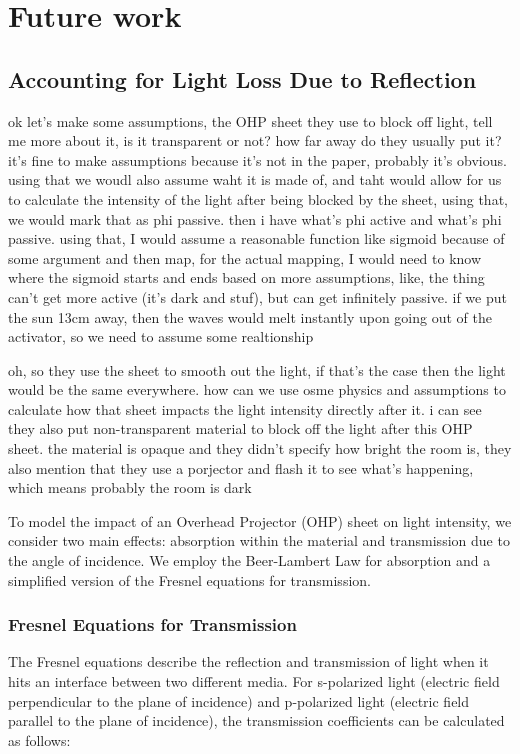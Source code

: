 \chapter{Future work}
\section{Accounting for Light Loss Due to Reflection} \label{sec:reflection-refraction}
ok let's make some assumptions, the OHP sheet they use to block off light, tell me more about it, is it transparent or not? how far away do they usually put it? it's fine to make assumptions because it's not in the paper, probably it's obvious. using that we woudl also assume waht it is made of, and taht would allow for us to calculate the intensity of the light after being blocked by the sheet, using that, we would mark that as phi passive. then i have what's phi active and what's phi passive. using that, I would assume a reasonable function like sigmoid because of some argument and then map, for the actual mapping, I would need to know where the sigmoid starts and ends based on more assumptions, like, the thing can't get more active (it's dark and stuf), but can get infinitely passive. if we put the sun 13cm away, then the waves would melt instantly upon going out of the activator, so we need to assume some realtionship


oh, so they use the sheet to smooth out the light, if that's the case then the light would be the same everywhere. how can we use osme physics and assumptions to calculate how that sheet impacts the light intensity directly after it.
i can see they also put non-transparent material to block off the light after this OHP sheet. the material is opaque and they didn't specify how bright the room is, they also mention that they use a porjector and flash it to see what's happening, which means probably the room is dark


To model the impact of an Overhead Projector (OHP) sheet on light intensity, we consider two main effects: absorption within the material and transmission due to the angle of incidence. We employ the Beer-Lambert Law for absorption and a simplified version of the Fresnel equations for transmission.

\subsection*{Fresnel Equations for Transmission}
The Fresnel equations describe the reflection and transmission of light when it hits an interface between two different media. For s-polarized light (electric field perpendicular to the plane of incidence) and p-polarized light (electric field parallel to the plane of incidence), the transmission coefficients can be calculated as follows:

